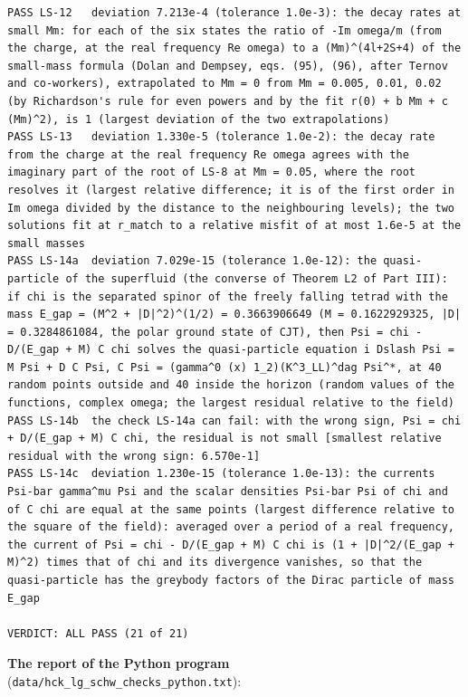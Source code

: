 \documentclass[
  10pt,
]{article}
\begin{document}
\begin{verbatim}
PASS LS-12   deviation 7.213e-4 (tolerance 1.0e-3): the decay rates at small Mm: for each of the six states the ratio of -Im omega/m (from the charge, at the real frequency Re omega) to a (Mm)^(4l+2S+4) of the small-mass formula (Dolan and Dempsey, eqs. (95), (96), after Ternov and co-workers), extrapolated to Mm = 0 from Mm = 0.005, 0.01, 0.02 (by Richardson's rule for even powers and by the fit r(0) + b Mm + c (Mm)^2), is 1 (largest deviation of the two extrapolations)
PASS LS-13   deviation 1.330e-5 (tolerance 1.0e-2): the decay rate from the charge at the real frequency Re omega agrees with the imaginary part of the root of LS-8 at Mm = 0.05, where the root resolves it (largest relative difference; it is of the first order in Im omega divided by the distance to the neighbouring levels); the two solutions fit at r_match to a relative misfit of at most 1.6e-5 at the small masses
PASS LS-14a  deviation 7.029e-15 (tolerance 1.0e-12): the quasi-particle of the superfluid (the converse of Theorem L2 of Part III): if chi is the separated spinor of the freely falling tetrad with the mass E_gap = (M^2 + |D|^2)^(1/2) = 0.3663906649 (M = 0.1622929325, |D| = 0.3284861084, the polar ground state of CJT), then Psi = chi - D/(E_gap + M) C chi solves the quasi-particle equation i Dslash Psi = M Psi + D C Psi, C Psi = (gamma^0 (x) 1_2)(K^3_LL)^dag Psi^*, at 40 random points outside and 40 inside the horizon (random values of the functions, complex omega; the largest residual relative to the field)
PASS LS-14b  the check LS-14a can fail: with the wrong sign, Psi = chi + D/(E_gap + M) C chi, the residual is not small [smallest relative residual with the wrong sign: 6.570e-1]
PASS LS-14c  deviation 1.230e-15 (tolerance 1.0e-13): the currents Psi-bar gamma^mu Psi and the scalar densities Psi-bar Psi of chi and of C chi are equal at the same points (largest difference relative to the square of the field): averaged over a period of a real frequency, the current of Psi = chi - D/(E_gap + M) C chi is (1 + |D|^2/(E_gap + M)^2) times that of chi and its divergence vanishes, so that the quasi-particle has the greybody factors of the Dirac particle of mass E_gap

VERDICT: ALL PASS (21 of 21)
\end{verbatim}

\textbf{The report of the Python program}
(\texttt{data/hck\_lg\_schw\_checks\_python.txt}):
\end{document}
